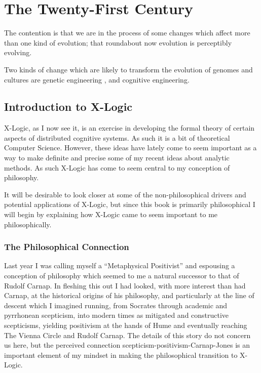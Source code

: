 
\newtheorem{iprin}{I}

\part{The Twenty-First Century}\label{partIV}

The contention is that we are in the process of some changes which affect more than one kind of evolution; that roundabout now evolution is perceptibly evolving.

Two kinds of change which are likely to transform the evolution of genomes and cultures are genetic engineering , and cognitive engineering.

\chapter{Introduction to X-Logic}

X-Logic, as I now see it, is an exercise in developing the formal theory of certain aspects of distributed cognitive systems.
As such it is a bit of theoretical Computer Science.
However, these ideas have lately come to seem important as a way to make definite and precise some of my recent ideas about analytic methods.
As such X-Logic has come to seem central to my conception of philosophy.

It will be desirable to look closer at some of the non-philosophical drivers and potential applications of X-Logic, but since this book is primarily philosophical I will begin by explaining how X-Logic came to seem important to me philosophically.

\section{The Philosophical Connection}

Last year I was calling myself a ``Metaphysical Positivist'' and espousing a conception of philosophy which seemed to me a natural successor to that of Rudolf Carnap.
In fleshing this out I had looked, with more interest than had Carnap, at the historical origins of his philosophy, and particularly at the line of descent which I imagined running, from Socrates through academic and pyrrhonean scepticism, into modern times as mitigated and constructive scepticisms, yielding positivism at the hands of Hume and eventually reaching The Vienna Circle and Rudolf Carnap.
The details of this story do not concern us here, but the perceived connection scepticism-positivism-Carnap-Jones is an important element of my mindset in making the philosophical transition to X-Logic.

